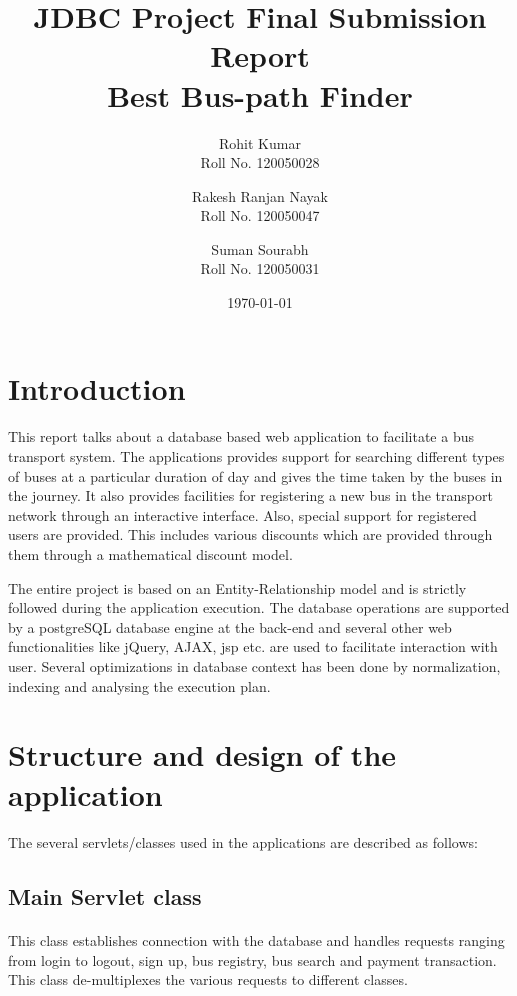 \documentclass[11pt]{article}
\title{\textbf{JDBC Project Final Submission Report \\ Best Bus-path Finder}}
\author{Rohit Kumar \\ Roll No. 120050028
		\and
		Rakesh Ranjan Nayak \\
		Roll No. 120050047\\
		\and
		Suman Sourabh \\
		Roll No. 120050031}
\date{\today}
\begin{document}
\maketitle

\section{Introduction}
\paragraph{}

This report talks about a database based web application to facilitate a bus transport system. The applications provides support for searching different types of buses at a particular duration of day and gives the time taken by the buses in the journey. It also provides facilities for registering a new bus in the transport network through an interactive interface. Also, special support for registered users are provided. This includes various discounts which are provided through them through a mathematical discount model.

The entire project is based on an Entity-Relationship model and is strictly followed during the application execution. The database operations are supported by a postgreSQL database engine at the back-end and several other web functionalities like jQuery, AJAX, jsp etc. are used to facilitate interaction with user. Several optimizations in database context has been done by normalization, indexing and analysing the execution plan.


\section{Structure and design of the application}
\paragraph{}
The several servlets/classes used in the applications are described as follows:

\subsection{Main Servlet class}
\paragraph{}
This class establishes connection with the database and handles requests ranging from login to logout, sign up, bus registry, bus search and  payment transaction. This class de-multiplexes the various requests to different classes.
\end{document}
